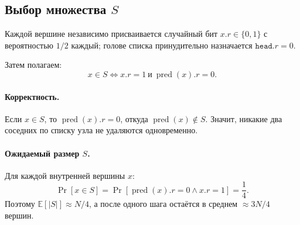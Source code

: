 \subsection{Выбор множества \texorpdfstring{$S$}{S}}

Каждой вершине независимо присваивается случайный бит $x.r \in \{0, 1\}$ с вероятностью $1/2$ каждый; голове списка принудительно назначается $\texttt{head}.r = 0$.

Затем полагаем:
\[
x \in S \iff x.r = 1 \ \text{и} \ \operatorname{pred}(x).r = 0.
\]

\paragraph{Корректность.} Если $x \in S$, то $\operatorname{pred}(x).r = 0$, откуда $\operatorname{pred}(x) \notin S$. Значит, никакие два соседних по списку узла не удаляются одновременно.

\paragraph{Ожидаемый размер $S$.} Для каждой внутренней вершины $x$:
\[
\Pr[x \in S] = \Pr[\operatorname{pred}(x).r = 0 \land x.r = 1] = \frac{1}{4}.
\]
Поэтому $\mathbb{E}[|S|] \approx N/4$, а после одного шага остаётся в среднем $\approx 3N/4$ вершин.

